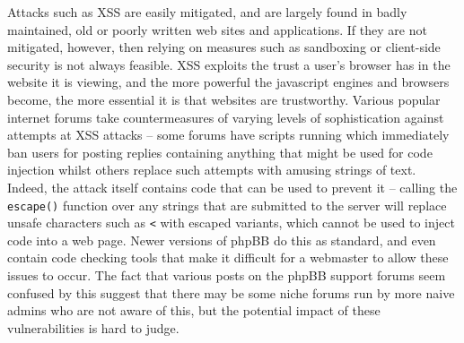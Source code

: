 Attacks such as XSS are easily mitigated\cite{cheatsheet}, and are largely found in badly maintained, old or poorly
written web sites and applications. If they are not mitigated, however, then relying on measures such as sandboxing or
client-side security is not always feasible. XSS exploits the trust a user's browser has in the website it is viewing,
and the more powerful the javascript engines and browsers become, the more essential it is that websites are
trustworthy. Various popular internet forums take countermeasures of varying levels of sophistication against attempts
at XSS attacks -- some forums have scripts running which immediately ban users for posting replies containing
anything that might be used for code injection whilst others replace such attempts with amusing strings of text. Indeed,
the attack itself contains code that can be used to prevent it -- calling the {\tt escape()} function over any strings
that are submitted to the server will replace unsafe characters such as {\tt <} with escaped variants, which cannot be
used to inject code into a web page. Newer versions of phpBB do this as standard, and even contain code checking tools
that make it difficult for a webmaster to allow these issues to occur. The fact that various posts on the phpBB support
forums seem confused by this suggest that there may be some niche forums run by more naive admins who are not aware of
this, but the potential impact of these vulnerabilities is hard to judge.

